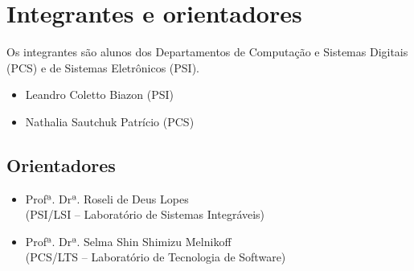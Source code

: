 \documentclass[a4paper,12pt,font=plain,header=plain]{abnt}
\begin{document}
  \section{Integrantes e orientadores}
    Os integrantes são alunos dos Departamentos de Computação e Sistemas Digitais
    (PCS) e de Sistemas Eletrônicos (PSI).

    \begin{itemize}
      \item Leandro Coletto Biazon (PSI)
      \item Nathalia Sautchuk Patrício (PCS)
    \end{itemize}

    \subsection{Orientadores}
    \begin{itemize}
    \item{
      Profª. Drª. Roseli de Deus Lopes \\
      (PSI/LSI – Laboratório de Sistemas Integráveis)
    }
    \item{
      Profª. Drª. Selma Shin Shimizu Melnikoff \\
      (PCS/LTS – Laboratório de Tecnologia de Software)
    }
    \end{itemize}
\end{document}
